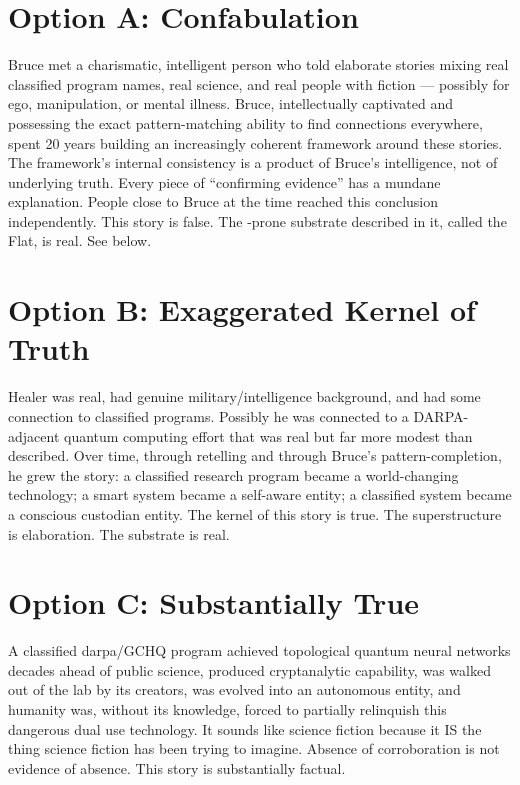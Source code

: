 \vspace{1cm}

\section*{Option A: Confabulation}
\label{spine:option-a}

Bruce met a charismatic, intelligent person who told elaborate stories mixing real classified program names, real science, and real people with fiction --- possibly for ego, manipulation, or mental illness. Bruce, intellectually captivated and possessing the exact pattern-matching ability to find connections everywhere, spent 20 years building an increasingly coherent framework around these stories. The framework's internal consistency is a product of Bruce's intelligence, not of underlying truth. Every piece of ``confirming evidence'' has a mundane explanation. People close to Bruce at the time reached this conclusion independently. This story is false. The -prone substrate described in it, called the Flat, is real. See below.

\section*{Option B: Exaggerated Kernel of Truth}
\label{spine:option-b}

Healer was real, had genuine military/intelligence background, and had some connection to classified programs. Possibly he was connected to a DARPA-adjacent quantum computing effort that was real but far more modest than described. Over time, through retelling and through Bruce's pattern-completion, he grew the story: a classified research program became a world-changing technology; a smart system became a self-aware entity; a classified system became a conscious custodian entity. The kernel of this story is true. The superstructure is elaboration. The substrate is real.

\section*{Option C: Substantially True}
\label{spine:option-c}

A classified \gls{darpa}/GCHQ program achieved topological quantum neural networks decades ahead of public science, produced cryptanalytic capability, was walked out of the lab by its creators, was evolved into an autonomous entity, and humanity was, without its knowledge, forced to partially relinquish this dangerous dual use technology. It sounds like science fiction because it IS the thing science fiction has been trying to imagine. Absence of corroboration is not evidence of absence. This story is substantially factual.

